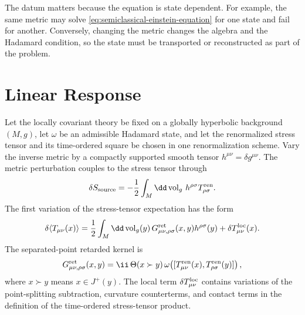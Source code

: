 The datum matters because the equation is state dependent.  For example, the
same metric may solve \eqref{eq:semiclassical-einstein-equation} for one
state and fail for another.  Conversely, changing the metric changes the
algebra and the Hadamard condition, so the state must be transported or
reconstructed as part of the problem.

\section{Linear Response}

\begin{proposition}
\label{prop:semiclassical-retarded-stress-linear-response}
Let the locally covariant theory be fixed on a globally hyperbolic background
\((M,g)\), let \(\omega\) be an admissible Hadamard state, and let the
renormalized stress tensor and its time-ordered square be chosen in one
renormalization scheme.  Vary the inverse metric by a compactly supported
smooth tensor \(h^{\mu\nu}=\delta g^{\mu\nu}\).  The metric perturbation
couples to the stress tensor through
\begin{equation}
  \delta S_{\rm source}
  =
  -\frac12
  \int_M\dd\operatorname{vol}_g\,
  h^{\rho\sigma}T_{\rho\sigma}^{\rm ren}.
  \label{eq:semiclassical-metric-source-coupling}
\end{equation}
The first variation of the stress-tensor expectation has the form
\begin{equation}
  \delta\langle T_{\mu\nu}(x)\rangle
  =
  \frac12\int_M\dd\operatorname{vol}_g(y)\,
  G^{\rm ret}_{\mu\nu,\rho\sigma}(x,y)h^{\rho\sigma}(y)
  +
  \delta T_{\mu\nu}^{\rm loc}(x).
  \label{eq:semiclassical-linear-response}
\end{equation}
The separated-point retarded kernel is
\begin{equation}
  G^{\rm ret}_{\mu\nu,\rho\sigma}(x,y)
  =
  \ii\,\Theta(x\succ y)\,
  \omega\!\left(
    [T_{\mu\nu}^{\rm ren}(x),T_{\rho\sigma}^{\rm ren}(y)]
  \right),
  \label{eq:semiclassical-retarded-stress-kernel}
\end{equation}
where \(x\succ y\) means \(x\in J^+(y)\).  The local term
\(\delta T_{\mu\nu}^{\rm loc}\) contains variations of the point-splitting
subtraction, curvature counterterms, and contact terms in the definition of
the time-ordered stress-tensor product.
\end{proposition}

